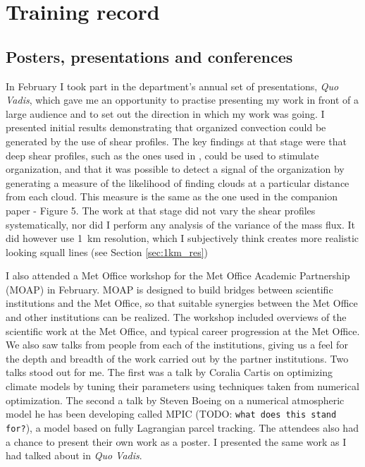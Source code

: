\documentclass[11pt,a4paper]{article}
\newcommand{\todo}{TODO: \texttt}
\begin{document}
\section{Training record}
\label{sec:Training record}

\subsection{Posters, presentations and conferences}

In February I took part in the department's annual set of presentations, \textit{Quo Vadis}, which gave me an opportunity to practise presenting my work in front of a large audience and to set out the direction in which my work was going. I presented initial results demonstrating that organized convection could be generated by the use of shear profiles. The key findings at that stage were that deep shear profiles, such as the ones used in \cite{cohen2006fluctuations}, could be used to stimulate organization, and that it was possible to detect a signal of the organization by generating a measure of the likelihood of finding clouds at a particular distance from each cloud. This measure is the same as the one used in the companion paper \cite{muetz2017effects} - Figure 5. The work at that stage did not vary the shear profiles systematically, nor did I perform any analysis of the variance of the mass flux. It did however use \SI{1}{km} resolution, which I subjectively think creates more realistic looking squall lines (see Section \ref{sec:1km_res})

I also attended a Met Office workshop for the Met Office Academic Partnership (MOAP) in February. MOAP is designed to build bridges between scientific institutions and the Met Office, so that suitable synergies between the Met Office and other institutions can be realized. The workshop included overviews of the scientific work at the Met Office, and typical career progression at the Met Office. We also saw talks from people from each of the institutions, giving us a feel for the depth and breadth of the work carried out by the partner institutions. Two talks stood out for me. The first was a talk by Coralia Cartis on optimizing climate models by tuning their parameters using techniques taken from numerical optimization. The second a talk by Steven Boeing on a numerical atmospheric model he has been developing called MPIC (\todo{what does this stand for?}), a model based on fully Lagrangian parcel tracking. The attendees also had a chance to present their own work as a poster. I presented the same work as I had talked about in \textit{Quo Vadis}.
\end{document}
